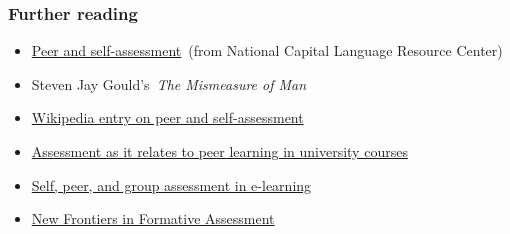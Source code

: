 \subsubsection{Further reading}

\begin{itemize}
\item
  \href{http://www.nclrc.org/essentials/assessing/peereval.htm}{Peer and
  self-assessment}~(from National Capital Language Resource Center)
\item
  Steven Jay
  Gould's~\emph{The
  Mismeasure of Man}
\item
  \href{http://en.wikipedia.org/wiki/Self-\_and\_Peer-Assessment}{Wikipedia
  entry on peer and self-assessment}
\item
  \href{http://www.elearning-reviews.org/topics/pedagogy/assessment/1999-boud-et-al-peer-learning-assessment/}{Assessment
  as it relates to peer learning in university courses}
\item
  \href{http://www.eric.ed.gov/ERICWebPortal/detail?accno=ED501727}{Self,
  peer, and group assessment in e-learning}
\item
  \href{http://www.hepg.org/hep/book/151}{New Frontiers in Formative
  Assessment}
\end{itemize}
